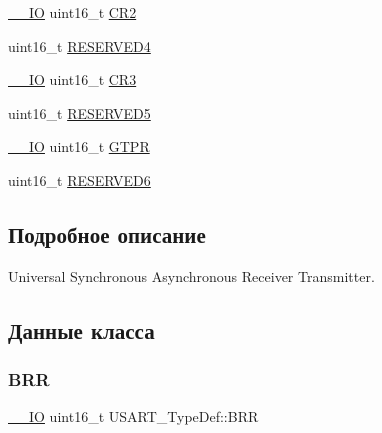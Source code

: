 \begin{DoxyCompactItemize}
\mbox{\hyperlink{group___c_m_s_i_s___c_m3__core__definitions_gaec43007d9998a0a0e01faede4133d6be}{\+\_\+\+\_\+\+IO}} uint16\+\_\+t \mbox{\hyperlink{struct_u_s_a_r_t___type_def_a2a494156d185762e4596696796c393bc}{C\+R2}}
\item 
uint16\+\_\+t \mbox{\hyperlink{struct_u_s_a_r_t___type_def_a6ac527c7428ad8807a7740c1f33f0351}{R\+E\+S\+E\+R\+V\+E\+D4}}
\item 
\mbox{\hyperlink{group___c_m_s_i_s___c_m3__core__definitions_gaec43007d9998a0a0e01faede4133d6be}{\+\_\+\+\_\+\+IO}} uint16\+\_\+t \mbox{\hyperlink{struct_u_s_a_r_t___type_def_a2b9d1df38cb1d745305c8190a8707a0f}{C\+R3}}
\item 
uint16\+\_\+t \mbox{\hyperlink{struct_u_s_a_r_t___type_def_aa893512291681dfbecc5baa899cfafbf}{R\+E\+S\+E\+R\+V\+E\+D5}}
\item 
\mbox{\hyperlink{group___c_m_s_i_s___c_m3__core__definitions_gaec43007d9998a0a0e01faede4133d6be}{\+\_\+\+\_\+\+IO}} uint16\+\_\+t \mbox{\hyperlink{struct_u_s_a_r_t___type_def_abe51502097b1fd281d0a2a1b157d769e}{G\+T\+PR}}
\item 
uint16\+\_\+t \mbox{\hyperlink{struct_u_s_a_r_t___type_def_acd89bb1cba0381c2be8a551e6d14e9f7}{R\+E\+S\+E\+R\+V\+E\+D6}}
\end{DoxyCompactItemize}


\subsection{Подробное описание}
Universal Synchronous Asynchronous Receiver Transmitter. 

\subsection{Данные класса}
\mbox{\label{struct_u_s_a_r_t___type_def_a2044eb2a0a8a731400d309741bceb2f7}} 
\subsubsection{\texorpdfstring{BRR}{BRR}}
{\footnotesize\ttfamily \mbox{\hyperlink{group___c_m_s_i_s___c_m3__core__definitions_gaec43007d9998a0a0e01faede4133d6be}{\+\_\+\+\_\+\+IO}} uint16\+\_\+t U\+S\+A\+R\+T\+\_\+\+Type\+Def\+::\+B\+RR}

\mbox{\label{struct_u_s_a_r_t___type_def_a5de50313b1437f7f926093f00902d37a}} 
